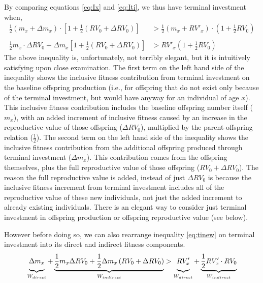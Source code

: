 \documentclass[12pt,review,authoryear]{elsarticle}
\begin{document}
By comparing equations \eqref{eq:Ix} and \eqref{eq:Iti}, we thus have terminal investment when,
\begin{equation}\label{eq:tinew}
	\begin{split}
		\frac{1}{2} \left( m_x + \Delta m_{x} \right) \cdot \left[1 + \frac{1}{2} \left( RV_0 + \Delta RV_0 \right) \right] &> \frac{1}{2} \left( m_x + RV'_{x} \right) \cdot \left(1 + \frac{1}{2} RV_0 \right)
		\\ \\
		\frac{1}{2}m_x \cdot \Delta RV_{0} + \Delta m_{x} \left[1 + \frac{1}{2} \left( RV_0 + \Delta RV_0 \right) \right] &> RV'_{x} \left(1 + \frac{1}{2} RV_0 \right) 
	\end{split}
\end{equation} 
The above inequality is, unfortunately, not terribly elegant, but it is intuitively satisfying upon close examination. The first term on the left hand side of the inequality shows the inclusive fitness contribution from terminal investment on the baseline offspring production (i.e., for offspring that do not exist only because of the terminal investment, but would have anyway for an individual of age $x$). This inclusive fitness contribution includes the baseline offspring number itself ($m_{x}$), with an added increment of inclusive fitness caused by an increase in the reproductive value of those offspring ($\Delta RV_{0}$), multiplied by the parent-offspring relation ($\frac{1}{2}$). The second term on the left hand side of the inequality shows the inclusive fitness contribution from the additional offspring produced through terminal investment ($\Delta m_{x}$). This contribution comes from the offspring themselves, plus the full reproductive value of those offspring ($RV_{0} + \Delta RV_{0}$). The reason the full reproductive value is added, instead of just $\Delta RV_{0}$ is because the inclusive fitness increment from terminal investment includes all of the reproductive value of these new individuals, not just the added increment to already existing individuals. There is an elegant way to consider just terminal investment in offspring production or offspring reproductive value (see below).

However before doing so, we can also rearrange inequality \eqref{eq:tinew} on terminal investment into its direct and indirect fitness components.
\begin{equation} \label{eq:tiw}
	\def\tallest{\vphantom{\frac{RV_x}{1}}}
	\underbrace {\Delta m_{x}\tallest }_{W_{direct}} + 
	\underbrace{ \frac{1}{2} m_x \Delta RV_{0} +
		\frac{1}{2} \Delta m_{x} \left( RV_0 + \Delta RV_0 \right) }_{W_{indirect}}  >
	\def\tallest{\vphantom{\frac{RV_x}{1}}}
	\underbrace{ RV'_{x}\tallest }_{W_{direct}} +
	\underbrace{ \frac{1}{2} RV'_{x} \cdot RV_0}_{W_{indirect}} 
\end{equation}
\end{document}
